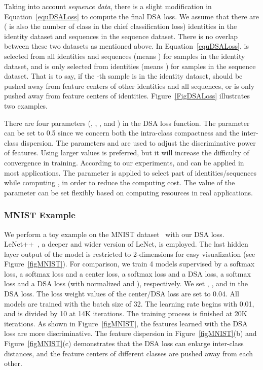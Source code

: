\documentclass[conference]{acmsiggraph}
\begin{document}
Taking into account \emph{sequence data}, there is a slight modification in Equation~\ref{equDSALoss} to compute the final DSA loss. We assume that there are  ( is also the number of class in the chief classification loss) identities in the identity dataset and  sequences in the sequence dataset. There is no overlap between these two datasets as mentioned above. In Equation~\ref{equDSALoss},  is selected from all  identities and  sequences (means ) for samples in the identity dataset, and  is only selected from  identities (means ) for samples in the sequence dataset. That is to say, if the -th sample is in the identity dataset,  should be pushed away from feature centers of other identities and all sequences, or  is only pushed away from feature centers of identities. Figure~\ref{FigDSALoss} illustrates two examples. 


There are four parameters (, , , and ) in the DSA loss function. The parameter  can be set to 0.5 since we concern both the intra-class compactness and the inter-class dispersion. The parameters  and  are used to adjust the discriminative power of features. Using larger values is preferred, but it will increase the difficulty of convergence in training. According to our experiments,  and  can be applied in most applications. The parameter  is applied to select part of identities/sequences while computing , in order to reduce the computing cost. The value of the parameter  can be set flexibly based on computing resources in real applications. 

\subsubsection{MNIST Example} We perform a toy example on the MNIST dataset~\cite{mnist} with our DSA loss. LeNet++~\cite{centerloss}, a deeper and wider version of LeNet, is employed. The last hidden layer output of the model is restricted to 2-dimensions for easy visualization (see Figure~\ref{figMNIST}). For comparison, we train 4 models supervised by a softmax loss, a softmax loss and a center loss, a softmax loss and a DSA loss, a softmax loss and a DSA loss (with normalized  and ), respectively. We set , ,  and  in the DSA loss. The loss weight values of the center/DSA loss are set to 0.04. All models are trained with the batch size of 32. The learning rate begins with 0.01, and is divided by 10 at 14K iterations. The training process is finished at 20K iterations. As shown in Figure~\ref{figMNIST}, the features learned with the DSA loss are more discriminative. The feature dispersion in Figure~\ref{figMNIST}(b) and Figure~\ref{figMNIST}(c) demonstrates that the DSA loss can enlarge inter-class distances, and the feature centers of different classes are pushed away from each other.
\end{document}
